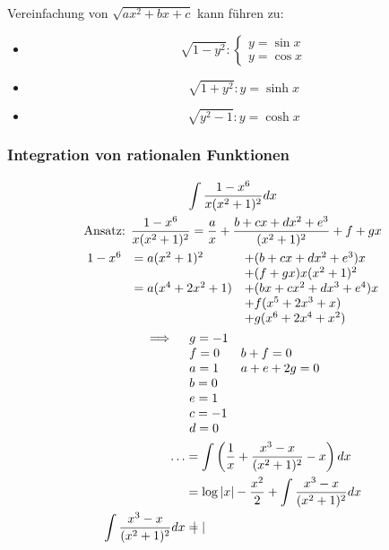 Vereinfachung von $\sqrt{ax^2+bx+c}$ kann führen zu:
\begin{itemize}
	\item \[ \sqrt{1-y^2} : \begin{cases}
			y = \sin x \\
			y = \cos x
		\end{cases}\]
	\item \[ \sqrt{1+y^2} : y = \sinh x \]
	\item \[ \sqrt{y^2-1} : y = \cosh x \]
\end{itemize}

\subsubsection{Integration von rationalen Funktionen}
\begin{bsp*}
	\begin{gather*}
		\int \frac{1-x^6}{x(x^2+1)^2} dx \\
		\text{Ansatz: } \frac{1-x^6}{x(x^2+1)^2} = \frac{a}{x} + \frac{b+cx+dx^2+e^3}{(x^2+1)^2} + f + gx \\
		\begin{matrix*}[l]
			1-x^6	&= a(x^2+1)^2		&+ (b+cx+dx^2+e^3)x \\
					&				&+ (f+gx)x(x^2+1)^2 \\
					&= a(x^4+2x^2+1)	&+ (bx+cx^2+dx^3+e^4)x \\
					&				&+ f(x^5+2x^3+x) \\
					&				&+ g(x^6+2x^4+x^2)
		\end{matrix*} \\
		\begin{matrix*}[l]
			\implies	&g = -1				\\
					&f= 0	&b + f = 0		\\
					&a = 1	&a + e + 2g = 0	\\
					&b = 0				\\
					&e = 1				\\
					&c = -1				\\
					&d = 0
		\end{matrix*} \\
		\begin{split}
			\dots						&= \int \left( \frac{1}{x} + \frac{x^3-x}{(x^2+1)^2} - x \right) dx \\
									&= \log\abs{x} - \frac{x^2}{2} + \int \frac{x^3-x}{(x^2+1)^2} dx \\
			\int \frac{x^3-x}{(x^2+1)^2} dx	&= \begin{vmatrix}

\end{vmatrix}
\end{split}
\end{gather*}
\end{bsp*}
